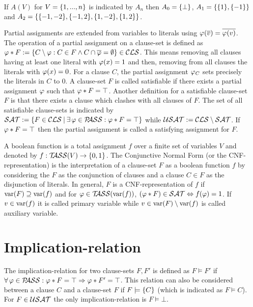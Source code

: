 \documentclass{report}
\begin{document}
\begin{examp}\label{exp:An}
If $A(V)$ for $V=\{ 1,..., n \}$ is indicated by $A_n$ then $A_0 = \{ \bot \}$, $A_1 = \{ \{ 1 \},\{ -1 \} \}$ and $A_2 = \{ \{ -1,-2 \},\{ -1,2 \},\{ 1,-2 \},\{ 1,2 \} \}$.
\end{examp}

Partial assignments are extended from variables to literals using $\varphi(\overline{v})=\overline{\varphi(v)}$. The operation of a partial assignment on a clause-set is defined as $\varphi * F := \{ C \setminus \varphi : C \in F \wedge C \cap \overline{\varphi} = \emptyset \} \in \mathcal{CLS}$. This means removing all clauses having at least one literal with $\varphi (x)=1$ and then, removing from all clauses the literals with $\varphi (x)=0$. For a clause $C$, the partial assignment $\varphi_C$ sets precisely the literals in $C$ to 0. A clause-set $F$ is called satisfiable if there exists a partial assignment $\varphi$ such that $\varphi * F = \top$. Another definition for a satisfiable clause-set $F$ is that there exists a clause which clashes with all clauses of $F$. The set of all satisfiable clause-sets is indicated by $\mathcal{SAT} := \{ F \in \mathcal{CLS} {\:|\:} \exists\, \varphi \in \mathcal{P\hspace{-0.32em}ASS} : \varphi * F = \top \}$ while $\mathcal{USAT} := \mathcal{CLS} \setminus \mathcal{SAT}$. If $\varphi * F = \top$ then the partial assignment is called a satisfying assignment for $F$.

A boolean function is a total assignment $f$ over a finite set of variables $V$ and denoted by $f:  \mathcal{T\hspace{-0.35em}ASS}(V) \rightarrow \{ 0,1 \}$. The Conjunctive Normal Form (or the CNF-representation) is the interpretation of a clause-set $F$ as a boolean function $f$ by considering the $F$ as the conjunction of clauses and a clause $C \in F$ as the disjunction of literals. In general, $F$ is a CNF-representation of $f$ if $\operatorname{var}(F) \supseteq \operatorname{var}(f)$ and for $\varphi \in \mathcal{T\hspace{-0.35em}ASS}(\operatorname{var}(f))$, $(\varphi * F) \in \mathcal{SAT} \Leftrightarrow f(\varphi) = 1$. If $v \in \operatorname{var}(f)$ it is called primary variable while $v \in \operatorname{var}(F) \setminus \operatorname{var}(f)$ is called auxiliary variable.

\section{Implication-relation}
\label{sec:imprel}

The implication-relation for two clause-sets $F, F'$ is defined as $F \models F'$ if $\forall\, \varphi \in \mathcal{P\hspace{-0.32em}ASS} : \varphi * F = \top \Rightarrow \varphi * F' = \top$. This relation can also be considered between a clause $C$ and a clause-set $F$ if $F \models \{ C \}$ (which is indicated as $F \models C$). For  $F \in \mathcal{USAT}$ the only implication-relation is $F \models \bot$. 
\end{document}
